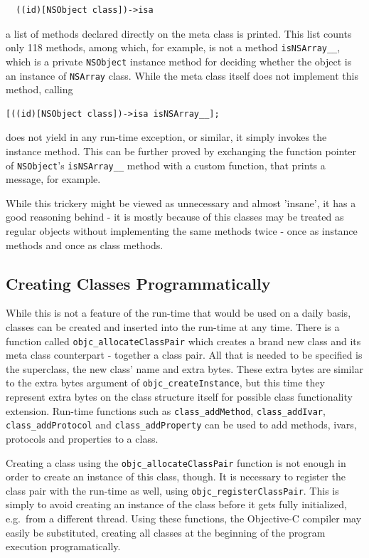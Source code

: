 \begin{verbatim}
  ((id)[NSObject class])->isa
\end{verbatim}

a list of methods declared directly on the meta class is printed. This list counts only 118 methods, among which, for example, is not a method \verb=isNSArray__=, which is a private \verb=NSObject= instance method for deciding whether the object is an instance of \verb=NSArray= class. While the meta class itself does not implement this method, calling

\begin{verbatim}
[((id)[NSObject class])->isa isNSArray__];
\end{verbatim}

does not yield in any run-time exception, or similar, it simply invokes the instance method. This can be further proved by exchanging the function pointer of \verb=NSObject='s \verb=isNSArray__= method with a custom function, that prints a message, for example.

While this trickery might be viewed as unnecessary and almost 'insane', it has a good reasoning behind - it is mostly because of this classes may be treated as regular objects without implementing the same methods twice - once as instance methods and once as class methods.

\subsection{Creating Classes Programmatically}

While this is not a feature of the run-time that would be used on a daily basis, classes can be created and inserted into the run-time at any time. There is a function called \verb=objc_allocateClassPair= which creates a brand new class and its meta class counterpart - together a class pair. All that is needed to be specified is the superclass, the new class' name and extra bytes. These extra bytes are similar to the extra bytes argument of \verb=objc_createInstance=, but this time they represent extra bytes on the class structure itself for possible class functionality extension. Run-time functions such as \verb=class_addMethod=, \verb=class_addIvar=, \verb=class_addProtocol= and \verb=class_addProperty= can be used to add methods, ivars, protocols and properties to a class.

Creating a class using the \verb=objc_allocateClassPair= function is not enough in order to create an instance of this class, though. It is necessary to register the class pair with the run-time as well, using \verb=objc_registerClassPair=. This is simply to avoid creating an instance of the class before it gets fully initialized, e.g.\ from a different thread. Using these functions, the Objective-C compiler may easily be substituted, creating all classes at the beginning of the program execution programatically.

